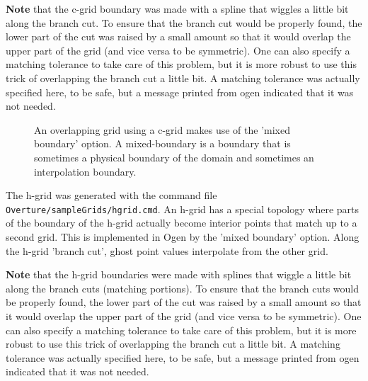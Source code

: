\documentclass[xcolor=rgb,svgnames,dvipsnames]{article}
\newcommand{\figures}{../fig}
\begin{document}
{\bf Note} that the c-grid boundary was made with a spline that wiggles a
little bit along the branch cut. To ensure that the branch cut would be
properly found, the lower part of the cut was raised by a small amount
so that it would overlap the upper part of the grid (and vice versa to be
symmetric). One can also specify a matching tolerance to take care of this problem,
but it is more robust to use this trick of overlapping the branch cut a little bit.
A matching tolerance was actually specified here, to be safe, but a message printed
from ogen indicated that it was not needed. 
% 
{
\newcommand{\figWidthd}{11cm}
\newcommand{\trimfig}[2]{\trimPlot{#1}{#2}{.0}{.0}{.25}{.25}}
\begin{figure}[hbt]
\begin{center}
\end{center}
  \caption{An overlapping grid using a c-grid makes use of the 'mixed boundary' option.
         A mixed-boundary is a boundary that is sometimes a physical boundary of the
     domain and sometimes an interpolation boundary.}  \label{fig:cgrid}
\end{figure}
}
The h-grid was generated with the command file {\tt Overture/sampleGrids/hgrid.cmd}.
An h-grid has a special topology where parts of the boundary of the h-grid
actually become interior points that match up to a second grid.
This is implemented in Ogen by the 'mixed boundary' option. Along the
h-grid 'branch cut', ghost point values interpolate from the other grid.

{\bf Note} that the h-grid boundaries were made with splines that wiggle a
little bit along the branch cuts (matching portions). To ensure that the branch cuts would be
properly found, the lower part of the cut was raised by a small amount
so that it would overlap the upper part of the grid (and vice versa to be
symmetric). One can also specify a matching tolerance to take care of this problem,
but it is more robust to use this trick of overlapping the branch cut a little bit.
A matching tolerance was actually specified here, to be safe, but a message printed
from ogen indicated that it was not needed. 
\end{document}
